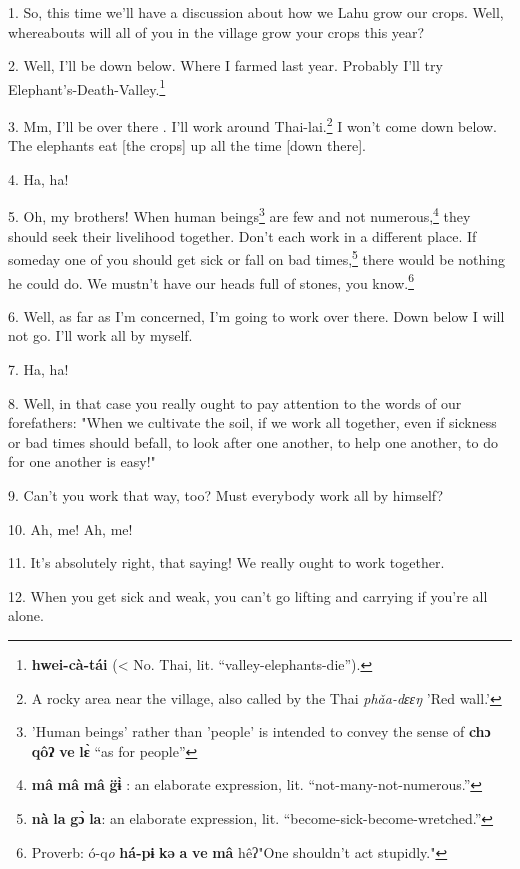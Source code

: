 \setcounter{footnote}{0}


1. So, this time we'll have a discussion about how we Lahu grow our crops. Well,
whereabouts will all of you in the village grow your crops this year?

2. Well, I'll be down below. Where I farmed last year. Probably I'll try Elephant's-Death-Valley.\footnote{\textbf{hwei-cà-tái} (< No. Thai, lit. ``valley-elephants-die'').}

3. Mm, I'll be over there . I'll work around Thai-lai.\footnote{A rocky area near the village, also called by the Thai \textit{phǎa-dɛɛŋ }'Red wall.'}
I won't come down below. The elephants eat [the crops] up all the time [down there].

4. Ha, ha!

5. Oh, my brothers! When human beings\footnote{'Human beings' rather than 'people' is intended to convey the sense of \textbf{chɔ} \textbf{qôʔ} \textbf{ve} \textbf{lɛ̀} ``as for people''} are few and not numerous,\footnote{\textbf{mâ} \textbf{mâ} \textbf{mâ} \textbf{g̈ɨ̀} : an elaborate expression, lit. ``not-many-not-numerous.''} they should
seek their livelihood together. Don't each work in a different place. If someday
one of you should get sick or fall on bad times,\footnote{\textbf{nà} \textbf{la} \textbf{gɔ̀} \textbf{la}: an elaborate expression, lit. ``become-sick-become-wretched.''} there would be nothing he could
do. We mustn't have our heads full of stones, you know.\footnote{Proverb: ó-q\textit{\emph{o}} \textbf{há-pɨ} \textbf{kə} \textbf{a} \textbf{ve} \textbf{mâ} hêʔ"One shouldn't act stupidly."}

6. Well, as far as I'm concerned, I'm going to work over there. Down below I will
not go. I'll work all by myself.

7. Ha, ha!

8. Well, in that case you really ought to pay attention to the words of our forefathers:
"When we cultivate the soil, if we work all together, even if sickness
or bad times should befall, to look after one another, to help one another, to
do for one another is easy!"

9. Can't you work that way, too? Must everybody work all by himself?

10. Ah, me! Ah, me!

11. It's absolutely right, that saying! We really ought to work together.

12. When you get sick and weak, you can't go lifting and carrying if you're all
alone.

